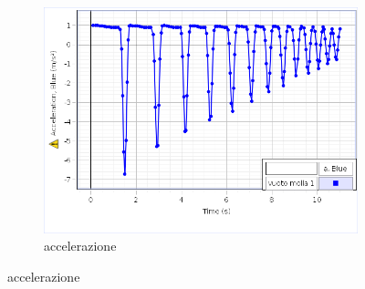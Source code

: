 \documentclass[a4paper]{article}
\theoremstyle{definition}
\begin{document}
\begin{figure}[!htbp]
{{			\begin{subfigure}{1.4\textwidth}
				\caption{accelerazione}
				\includegraphics[scale=1.2]{capstone_data/molla_1_acc.png}
			\end{subfigure}%
		}
	}
\end{figure}
\end{document}
